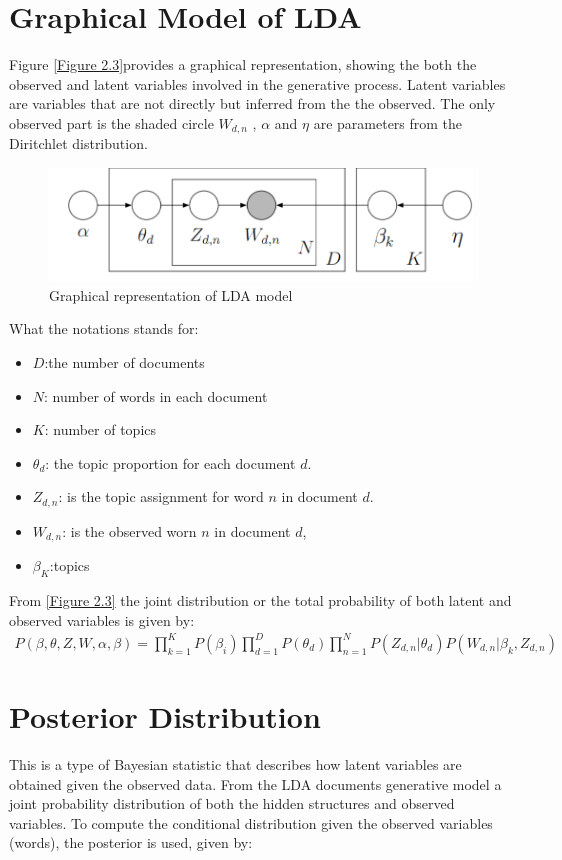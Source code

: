 \section{Graphical Model of LDA}
Figure \eqref{Figure 2.3}provides a graphical representation, showing the both the observed and latent variables involved in the generative process. Latent variables are variables that are not directly but inferred from the the observed.
The only observed part is the shaded circle $W_{d,n}$ , $\alpha$ and $\eta$ are parameters from the Diritchlet distribution.
\begin{figure}[hbtp]
\centering
\includegraphics[scale=0.5]{Graphical.png}
\caption{Graphical representation of LDA model} \label{Figure 2.3}
\end{figure}
What the notations stands for:
\begin{itemize}
\item$D$:the number of documents
\item$N$: number of words in each document
\item$K$: number of topics
\item$\theta_d$: the topic proportion for each document $d$.
\item $Z_{d,n}$: is the topic assignment for word $n$ in document $d$.
\item $W_{d,n}$: is the observed worn $n$ in document $d$,
\item $\beta_K$:topics
\end{itemize}
From \eqref{Figure 2.3} the joint  distribution or the total probability of both latent and observed variables is given by:
\begin{align}
P(\beta,\theta,Z,W, \alpha, \beta )=\prod_{k=1}^{K}P(\beta_i)\prod_{d=1}^{D}P(\theta_d)
\prod_{n=1}^{N}P(Z_{d,n}|\theta_d)P(W_{d,n}|\beta_k,Z_{d,n})
\end{align}
\section{Posterior Distribution}
This is a type of Bayesian statistic that describes how  latent variables are obtained given the observed data. From the LDA documents generative model a joint probability distribution of both the hidden structures and observed variables. To compute the conditional distribution given the observed variables (words), the posterior is used, given by:

